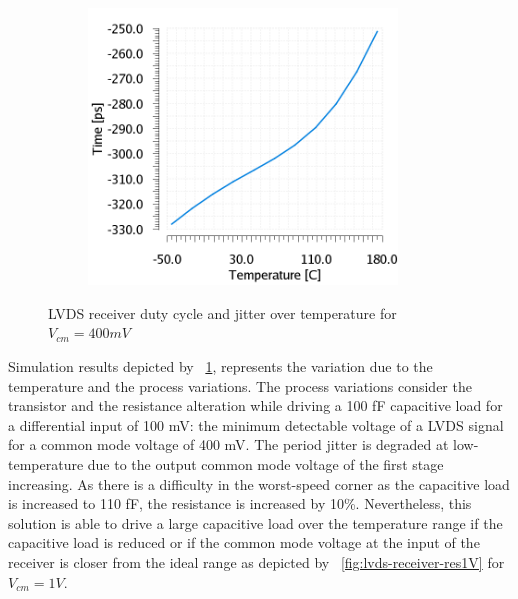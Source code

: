 \begin{figure}[htp]
\begin{subfigure}[b]{0.32\textwidth}
        \includegraphics[width=0.9\textwidth]{Chapter5/Figs/lvds/ErrorClockPeriod.png}
    \end{subfigure}
    \caption{LVDS receiver duty cycle and jitter over temperature for $V_{cm} = 400 mV$}
    \label{fig:lvds-receiver-res}
\end{figure}

Simulation results depicted by \figurename~\ref{fig:lvds-receiver-res}, represents the variation due to the temperature and the process variations. The process variations consider the transistor and the resistance alteration while driving a 100 fF capacitive load for a differential input of 100 mV: the minimum detectable voltage of a LVDS signal for a common mode voltage of 400 mV. The period jitter is degraded at low-temperature due to the output common mode voltage of the first stage increasing. As there is a difficulty in the worst-speed corner as the capacitive load is increased to 110 fF, the resistance is increased by 10\%. Nevertheless, this solution is able to drive a large capacitive load over the temperature range if the capacitive load is reduced or if the common mode voltage at the input of the receiver is closer from the ideal range as depicted by \figurename~\ref{fig:lvds-receiver-res1V} for $V_{cm} = 1 V$.

